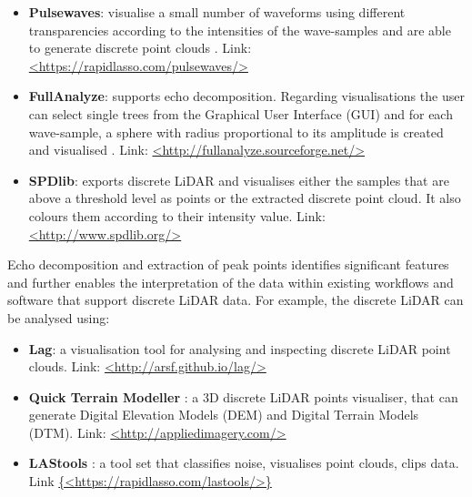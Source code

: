 \documentclass{subfiles}
\begin{document}
	\begin{itemize}
		\item \textbf{Pulsewaves}: visualise a small number of waveforms using different transparencies according to the intensities of the wave-samples and are able to generate discrete point clouds \cite{Isenburg2012Pulsewaves}. \newline Link: \url{<https://rapidlasso.com/pulsewaves/>}
	    \item \textbf{FullAnalyze}: supports echo decomposition. Regarding visualisations the user can select single trees from the Graphical User Interface (GUI) and for each wave-sample, a sphere with radius proportional to its amplitude is created and visualised \cite{Chauve2009}. \newline Link: \url{<http://fullanalyze.sourceforge.net/>} 
    	\item \textbf{SPDlib}: exports discrete LiDAR and visualises either the samples that are above a threshold level as points or the extracted discrete point cloud. It also colours them according to their intensity value\cite{Bunting2013}. \newline Link: \url{<http://www.spdlib.org/>} 
	\end{itemize}

	\par  Echo decomposition and extraction of peak points identifies significant features and further enables the interpretation of the data within existing workflows and software that support discrete LiDAR data. For example, the discrete LiDAR can be analysed using: 
	
	\begin{itemize}
	\item \textbf{Lag}: a visualisation tool for analysing and inspecting discrete LiDAR point clouds. \newline Link: \url{<http://arsf.github.io/lag/>}
	
	\item \textbf{Quick Terrain Modeller} : a 3D discrete LiDAR points visualiser, that can generate Digital Elevation Models (DEM) and Digital Terrain Models (DTM). \newline Link: \url{<http://appliedimagery.com/>}
	
	\item \textbf{LAStools} : a tool set that classifies noise, visualises point clouds, clips data.  \newline Link \url{{<https://rapidlasso.com/lastools/>}}
	\end{itemize}
		
\end{document}
